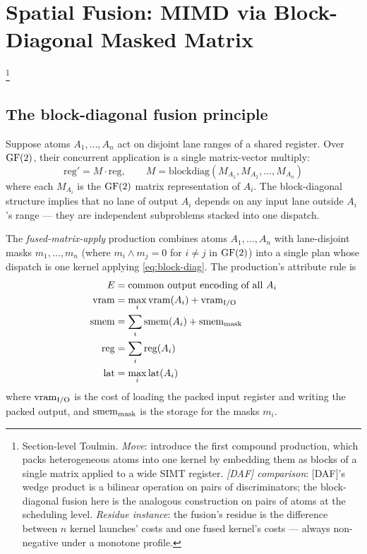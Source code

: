 \section{Spatial Fusion: MIMD via Block-Diagonal Masked Matrix}
\label{sec:fusion}\footnote{Section-level Toulmin. \emph{Move}: introduce the first compound production, which packs heterogeneous atoms into one kernel by embedding them as blocks of a single matrix applied to a wide SIMT register. \emph{[DAF] comparison}: [DAF]'s wedge product is a bilinear operation on pairs of discriminators; the block-diagonal fusion here is the analogous construction on pairs of atoms at the scheduling level. \emph{Residue instance}: the fusion's residue is the difference between $n$ kernel launches' costs and one fused kernel's costs --- always non-negative under a monotone profile.}

\subsection{The block-diagonal fusion principle}

Suppose atoms $A_1, \ldots, A_n$ act on disjoint lane
ranges of a shared register. Over $\operatorname{GF}(2)$, their
concurrent application is a single matrix-vector
multiply:
\begin{equation}\label{eq:block-diag}
  \mathrm{reg}' = M \cdot \mathrm{reg},
  \qquad
  M = \mathrm{blockdiag}(M_{A_1}, M_{A_2}, \ldots,
  M_{A_n})
\end{equation}
where each $M_{A_i}$ is the $\operatorname{GF}(2)$ matrix
representation of $A_i$. The block-diagonal structure
implies that no lane of output $A_i$ depends on any
input lane outside $A_i$'s range --- they are
independent subproblems stacked into one dispatch.

\begin{definition}
  \label{def:fused-apply}
  The \emph{fused-matrix-apply} production combines
  atoms $A_1, \ldots, A_n$ with lane-disjoint masks
  $m_1, \ldots, m_n$ (where $m_i \wedge m_j = 0$ for
  $i \neq j$ in $\operatorname{GF}(2)$) into a single plan whose
  dispatch is one kernel applying
  \eqref{eq:block-diag}. The production's attribute
  rule is
  \begin{align}
    E &= \text{common output encoding of all } A_i \\
    \operatorname{vram} &= \max_i \operatorname{vram}(A_i) + \operatorname{vram}_{\mathrm{I/O}} \\
    \operatorname{smem} &= \sum_i \operatorname{smem}(A_i) + \operatorname{smem}_{\mathrm{mask}} \\
    \operatorname{reg}  &= \sum_i \operatorname{reg}(A_i)  \\
    \operatorname{lat}  &= \max_i \operatorname{lat}(A_i)
  \end{align}
  where $\operatorname{vram}_{\mathrm{I/O}}$ is the cost of loading
  the packed input register and writing the packed
  output, and $\operatorname{smem}_{\mathrm{mask}}$ is the storage
  for the masks $m_i$.
\end{definition}

